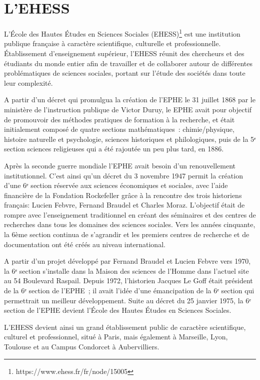 \documentclass[a4paper,12pt,twoside]{book}
\begin{document}
	\section{L’EHESS}

L’École des Hautes Études en Sciences Sociales (\Gls{EHESS})\footnote{https://www.ehess.fr/fr/node/15005} est une institution publique française à caractère scientifique, culturelle et professionnelle. Établissement d’enseignement supérieur, l’EHESS réunit des chercheurs et des étudiants du monde entier afin de travailler et de collaborer autour de différentes problématiques de sciences sociales, portant sur l’étude des sociétés dans toute leur complexité.

A partir d’un décret qui promulgua la création de l’\Gls{EPHE} le 31 juillet 1868 par le ministère de l’instruction publique de Victor Duruy, le EPHE avait pour objectif de promouvoir des méthodes pratiques de formation à la recherche, et était initialement composé de quatre sections mathématiques : chimie/physique, histoire naturelle et psychologie, sciences historiques et philologiques, puis de la 5ᵉ section sciences religieuses qui a été rajoutée un peu plus tard, en 1886.

Après la seconde guerre mondiale l’\Gls{EPHE} avait besoin d’un renouvellement institutionnel. C’est ainsi qu’un décret du 3 novembre 1947 permit la création d’une 6ᵉ section réservée aux sciences économiques et sociales, avec l’aide financière de la Fondation Rockefeller grâce à la rencontre des trois historiens français: Lucien Febvre, Fernand Braudel et Charles Moraz. L’objectif était de rompre avec l’enseignement traditionnel en créant des séminaires et des centres de recherches dans tous les domaines des sciences sociales. Vers les années cinquante, la 6ème section continua de s’agrandir et les premiers centres de recherche et de documentation ont été créés au niveau international.

A partir d’un projet développé par Fernand Braudel et Lucien Febvre vers 1970, la 6ᵉ section s’installe dans la Maison des sciences de l’Homme dans l’actuel site au 54 Boulevard Raspail. Depuis 1972, l’historien Jacques Le Goff était président de la 6ᵉ section de l’EPHE ; il avait l’idée d’une émancipation de la 6ᵉ section qui permettrait un meilleur développement. Suite au décret du 25 janvier 1975, la 6ᵉ section de l’\Gls{EPHE} devient l’École des Hautes Études en Sciences Sociales.

L’\Gls{EHESS} devient ainsi un grand établissement public de caractère scientifique, culturel et professionnel, situé à Paris, mais également à Marseille, Lyon, Toulouse et au Campus Condorcet à Aubervilliers. \\                              
\end{document}
